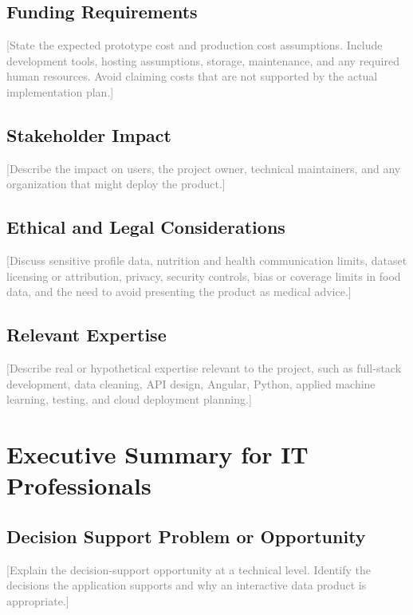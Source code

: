\documentclass[12pt]{report}
\newcommand{\placeholder}[1]{\textcolor{gray}{[#1]}}
\begin{document}
\section{Funding Requirements}
\placeholder{State the expected prototype cost and production cost assumptions. Include development tools, hosting assumptions, storage, maintenance, and any required human resources. Avoid claiming costs that are not supported by the actual implementation plan.}

\section{Stakeholder Impact}
\placeholder{Describe the impact on users, the project owner, technical maintainers, and any organization that might deploy the product.}

\section{Ethical and Legal Considerations}
\placeholder{Discuss sensitive profile data, nutrition and health communication limits, dataset licensing or attribution, privacy, security controls, bias or coverage limits in food data, and the need to avoid presenting the product as medical advice.}

\section{Relevant Expertise}
\placeholder{Describe real or hypothetical expertise relevant to the project, such as full-stack development, data cleaning, API design, Angular, Python, applied machine learning, testing, and cloud deployment planning.}

\chapter{Executive Summary for IT Professionals}

\section{Decision Support Problem or Opportunity}
\placeholder{Explain the decision-support opportunity at a technical level. Identify the decisions the application supports and why an interactive data product is appropriate.}
\end{document}

